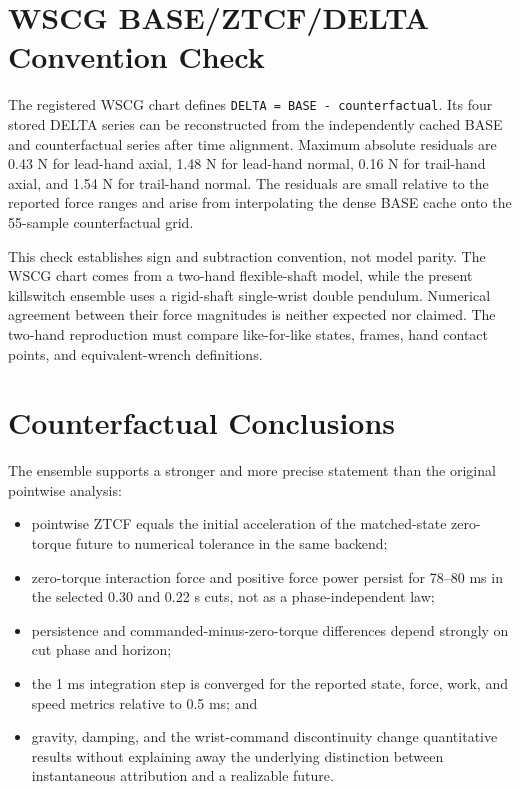 \documentclass[
  letterpaper,
]{report}
\providecommand{\tightlist}{%
  \setlength{\itemsep}{0pt}\setlength{\parskip}{0pt}}
\begin{document}
\section{WSCG BASE/ZTCF/DELTA Convention
Check}\label{sec-wscg-delta-check}

The registered WSCG chart defines
\texttt{DELTA\ =\ BASE\ -\ counterfactual}. Its four stored DELTA series
can be reconstructed from the independently cached BASE and
counterfactual series after time alignment. Maximum absolute residuals
are 0.43 N for lead-hand axial, 1.48 N for lead-hand normal, 0.16 N for
trail-hand axial, and 1.54 N for trail-hand normal. The residuals are
small relative to the reported force ranges and arise from interpolating
the dense BASE cache onto the 55-sample counterfactual grid.

This check establishes sign and subtraction convention, not model
parity. The WSCG chart comes from a two-hand flexible-shaft model, while
the present killswitch ensemble uses a rigid-shaft single-wrist double
pendulum. Numerical agreement between their force magnitudes is neither
expected nor claimed. The two-hand reproduction must compare
like-for-like states, frames, hand contact points, and equivalent-wrench
definitions.

\section{Counterfactual Conclusions}\label{sec-ensemble-conclusions}

The ensemble supports a stronger and more precise statement than the
original pointwise analysis:

\begin{itemize}
\tightlist
\item
  pointwise ZTCF equals the initial acceleration of the matched-state
  zero-torque future to numerical tolerance in the same backend;
\item
  zero-torque interaction force and positive force power persist for
  78--80 ms in the selected 0.30 and 0.22 s cuts, not as a
  phase-independent law;
\item
  persistence and commanded-minus-zero-torque differences depend
  strongly on cut phase and horizon;
\item
  the 1 ms integration step is converged for the reported state, force,
  work, and speed metrics relative to 0.5 ms; and
\item
  gravity, damping, and the wrist-command discontinuity change
  quantitative results without explaining away the underlying
  distinction between instantaneous attribution and a realizable future.
\end{itemize}
\end{document}
